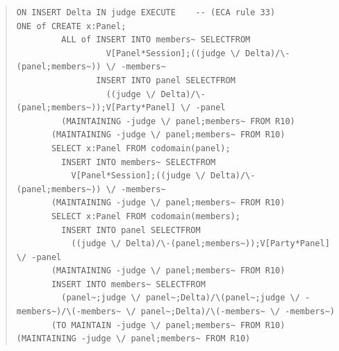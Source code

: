 \documentclass[10pt,a4paper]{report}              %
\theoremstyle{plain}\theorembodyfont{\rmfamily}\newtheorem{definition}{Definition}[section]
\theoremstyle{plain}\theorembodyfont{\rmfamily}\newtheorem{designrule}[definition]{Requirement}
\begin{document}
\begin{quote}
\begin{verbatim}
ON INSERT Delta IN judge EXECUTE    -- (ECA rule 33)
ONE of CREATE x:Panel;
         ALL of INSERT INTO members~ SELECTFROM
                  V[Panel*Session];((judge \/ Delta)/\-(panel;members~)) \/ -members~
                INSERT INTO panel SELECTFROM
                  ((judge \/ Delta)/\-(panel;members~));V[Party*Panel] \/ -panel
         (MAINTAINING -judge \/ panel;members~ FROM R10)
       (MAINTAINING -judge \/ panel;members~ FROM R10)
       SELECT x:Panel FROM codomain(panel);
         INSERT INTO members~ SELECTFROM
           V[Panel*Session];((judge \/ Delta)/\-(panel;members~)) \/ -members~
       (MAINTAINING -judge \/ panel;members~ FROM R10)
       SELECT x:Panel FROM codomain(members);
         INSERT INTO panel SELECTFROM
           ((judge \/ Delta)/\-(panel;members~));V[Party*Panel] \/ -panel
       (MAINTAINING -judge \/ panel;members~ FROM R10)
       INSERT INTO members~ SELECTFROM
         (panel~;judge \/ panel~;Delta)/\(panel~;judge \/ -members~)/\(-members~ \/ panel~;Delta)/\(-members~ \/ -members~)
       (TO MAINTAIN -judge \/ panel;members~ FROM R10)
(MAINTAINING -judge \/ panel;members~ FROM R10)
\end{verbatim}
\end{quote}
\end{document}
